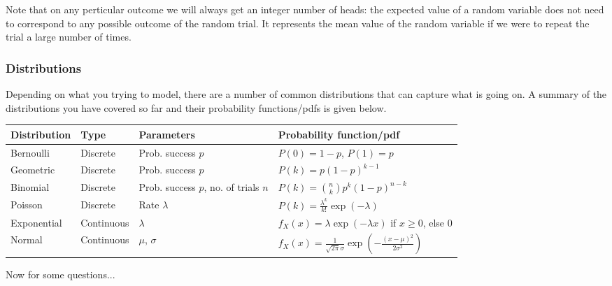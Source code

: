 Note that on any perticular outcome we will always get an integer number of
heads: the expected value of a random variable does not need to correspond to
any possible outcome of the random trial. It represents the mean value of the
random variable if we were to repeat the trial a large number of times.

\subsubsection*{Distributions}
Depending on what you trying to model, there are a number of common distributions that can capture what is going on. A summary of the distributions you have covered so far and their probability functions/pdfs is given below.

\begin{center}
    \begin{tabular}{|p{2.5cm} | p{2.5cm}| p{4cm} | p{5cm}|}
    \hline
    {\bf Distribution} & {\bf Type} & {\bf Parameters} & {\bf Probability function/pdf} \\ \hline
    Bernoulli & Discrete & Prob. success $p$ & $P(0)=1-p$, $P(1)=p$ \\ \hline
    Geometric & Discrete & Prob. success $p$ & $P(k)=p(1-p)^{k-1}$ \\ \hline
    Binomial & Discrete & Prob. success $p$, no. of trials $n$ & $P(k)=\binom{n}{k} p^{k} (1-p)^{n-k}$ \\ \hline
    Poisson & Discrete & Rate $\lambda$ & $P(k)=\frac{\lambda^{k}}{k!}\exp(-\lambda)$ \\ \hline
    Exponential & Continuous & $\lambda$ & $f_{X}(x)=\lambda\exp (-\lambda x)$ if $x\geq 0$, else 0 \\ \hline
    Normal & Continuous & $\mu$, $\sigma$ & $f_{X}(x)=\frac{1}{\sqrt{2 \pi} \sigma}\exp \left( - \frac{(x-\mu)^{2}}{2 \sigma^{2}} \right)$ \\
    \hline
    \end{tabular}
\end{center}

Now for some questions...\\
